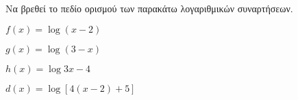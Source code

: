Να βρεθεί το πεδίο ορισμού των παρακάτω λογαριθμικών συναρτήσεων.
\begin{rlist}
\item $ f(x)=\log{(x-2)} $
\item $ g(x)=\log{(3-x)} $
\item $ h(x)=\log{3x-4} $
\item $ d(x)=\log{\left[ 4(x-2)+5\right] } $
\end{rlist}
